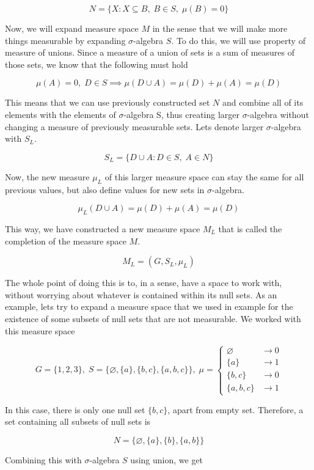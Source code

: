 \documentclass{article}
\begin{document}
\[ N=\{X:X \subseteq B,\;B \in S,\;\mu(B)=0\} \]

Now, we will expand measure space $M$ in the sense that we will make more things measurable by expanding $\sigma$-algebra $S$. To do this, we will use property of measure of unions. Since a measure of a union of sets is a sum of measures of those sets, we know that the following must hold

\[ \mu(A)=0,\;D \in S \implies \mu(D \cup A)=\mu(D)+\mu(A)=\mu(D) \]

This means that we can use previously constructed set $N$ and combine all of its elements with the elements of $\sigma$-algebra S, thus creating larger $\sigma$-algebra without changing a measure of previously measurable sets. Lets denote larger $\sigma$-algebra with $S_{L}$.

\[ S_{L}=\{D \cup A: D \in S,\;A \in N\} \]

Now, the new measure $\mu_{L}$ of this larger measure space can stay the same for all previous values, but also define values for new sets in $\sigma$-algebra.

\[ \mu_{L}(D \cup A)=\mu(D) + \mu(A) = \mu(D) \]

This way, we have constructed a new measure space $M_{L}$ that is called the completion of the measure space $M$.

\[ M_{L}=(G,S_{L},\mu_{L}) \]

The whole point of doing this is to, in a sense, have a space to work with, without worrying about whatever is contained within its null sets. As an example, lets try to expand a measure space that we used in example for the existence of some subsets of null sets that are not measurable. We worked with this measure space

\[ G=\{1,2,3\},\;S=\{\varnothing, \{a\},\{b,c\},\{a,b,c\}\},\; \mu=\begin{cases}
    \varnothing & \to 0 \\
    \{a\} & \to 1 \\
    \{b,c\} & \to 0 \\
    \{a,b,c\} & \to 1
\end{cases} \]

In this case, there is only one null set $\{b,c\}$, apart from empty set. Therefore, a set containing all subsets of null sets is

\[N=\{\varnothing, \{a\}, \{b\}, \{a,b\}\}\]

Combining this with $\sigma$-algebra $S$ using union, we get
\end{document}
